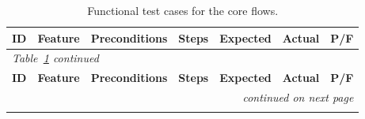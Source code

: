 \documentclass[11pt]{article}
\begin{document}
{\footnotesize
\begin{longtable}{p{0.7cm} p{1.9cm} p{2.2cm} p{3.7cm} p{3.0cm} p{1.9cm} p{0.8cm}}
\caption{Functional test cases for the core flows.}\label{tab:tc}\\
\toprule
\textbf{ID} & \textbf{Feature} & \textbf{Preconditions} & \textbf{Steps} &
\textbf{Expected} & \textbf{Actual} & \textbf{P/F} \\
\midrule
\endfirsthead
\multicolumn{7}{l}{\footnotesize\itshape Table~\ref{tab:tc} continued}\\
\toprule
\textbf{ID} & \textbf{Feature} & \textbf{Preconditions} & \textbf{Steps} &
\textbf{Expected} & \textbf{Actual} & \textbf{P/F} \\
\midrule
\endhead
\midrule \multicolumn{7}{r}{\footnotesize\itshape continued on next page}\\
\endfoot
\bottomrule
\endlastfoot


\end{longtable}}
\end{document}
